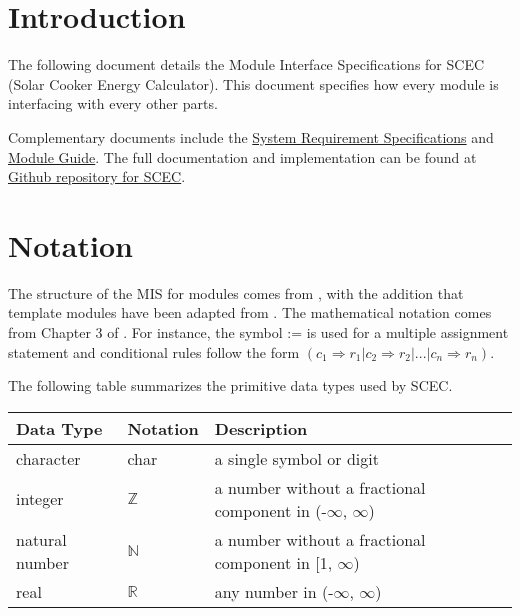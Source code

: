 \documentclass[12pt, titlepage]{article}
\begin{document}
\newpage

\tableofcontents

\newpage


\section{Introduction}

The following document details the Module Interface Specifications for
SCEC (Solar Cooker Energy Calculator). This document specifies how every module is interfacing with every other parts. 

Complementary documents include the \href{https://github.com/DeeshaPatel/CAS-741-Solar-Cooker/blob/2a6c0175891c01960d83cb99b73a762a9b2d2508/docs/SRS/SRS.pdf}{System Requirement Specifications}
and \href{https://github.com/DeeshaPatel/CAS-741-Solar-Cooker/blob/c7cc1be3611cae9110b84940b64ef40c7d29aa02/docs/Design/SoftArchitecture/MG.pdf}{Module Guide}.  The full documentation and implementation can be
found at \href{https://github.com/DeeshaPatel/CAS-741-Solar-Cooker.git}{Github repository for SCEC}.

\section{Notation}


The structure of the MIS for modules comes from \citet{HoffmanAndStrooper1995},
with the addition that template modules have been adapted from
\cite{GhezziEtAl2003}.  The mathematical notation comes from Chapter 3 of
\citet{HoffmanAndStrooper1995}.  For instance, the symbol := is used for a
multiple assignment statement and conditional rules follow the form $(c_1
\Rightarrow r_1 | c_2 \Rightarrow r_2 | ... | c_n \Rightarrow r_n )$.

The following table summarizes the primitive data types used by SCEC. 

\begin{center}
\renewcommand{\arraystretch}{1.2}
\noindent 
\begin{tabular}{l l p{7.5cm}} 
\toprule 
\textbf{Data Type} & \textbf{Notation} & \textbf{Description}\\ 
\midrule
character & char & a single symbol or digit\\
integer & $\mathbb{Z}$ & a number without a fractional component in (-$\infty$, $\infty$) \\
natural number & $\mathbb{N}$ & a number without a fractional component in [1, $\infty$) \\
real & $\mathbb{R}$ & any number in (-$\infty$, $\infty$)\\
\bottomrule
\end{tabular} 
\end{center}
\end{document}
